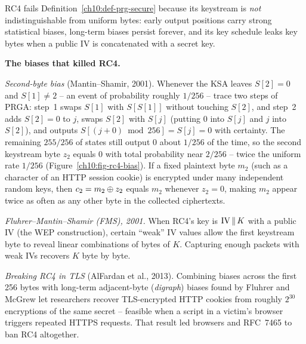 RC4 fails Definition~\ref{ch10:def-prg-secure} because its keystream is \emph{not} indistinguishable from uniform bytes: early output positions carry strong statistical biases, long-term biases persist forever, and its key schedule leaks key bytes when a public IV is concatenated with a secret key.

\begin{attackbox}
\label{ch10:attack-rc4-bias}
\textbf{The biases that killed RC4.}

\emph{Second-byte bias} (Mantin--Shamir, 2001). Whenever the KSA leaves $S[2] = 0$ and $S[1] \ne 2$ -- an event of probability roughly $1/256$ -- trace two steps of PRGA: step~1 swaps $S[1]$ with $S[S[1]]$ without touching $S[2]$, and step~2 adds $S[2] = 0$ to $j$, swaps $S[2]$ with $S[j]$ (putting $0$ into $S[j]$ and $j$ into $S[2]$), and outputs $S[(j + 0) \bmod 256] = S[j] = 0$ with certainty. The remaining $255/256$ of states still output $0$ about $1/256$ of the time, so the second keystream byte $z_2$ equals $0$ with total probability near $2/256$ -- twice the uniform rate $1/256$ (Figure~\ref{ch10:fig-rc4-bias}). If a fixed plaintext byte $m_2$ (such as a character of an HTTP session cookie) is encrypted under many independent random keys, then $c_2 = m_2 \oplus z_2$ equals $m_2$ whenever $z_2 = 0$, making $m_2$ appear twice as often as any other byte in the collected ciphertexts.

\emph{Fluhrer--Mantin--Shamir (FMS), 2001.} When RC4's key is $\text{IV} \,\|\, K$ with a public IV (the WEP construction), certain ``weak'' IV values allow the first keystream byte to reveal linear combinations of bytes of $K$. Capturing enough packets with weak IVs recovers $K$ byte by byte.

\emph{Breaking RC4 in TLS} (AlFardan et al., 2013). Combining biases across the first 256 bytes with long-term adjacent-byte (\emph{digraph}) biases found by Fluhrer and McGrew let researchers recover TLS-encrypted HTTP cookies from roughly $2^{30}$ encryptions of the same secret -- feasible when a script in a victim's browser triggers repeated HTTPS requests. That result led browsers and RFC~7465 to ban RC4 altogether.
\end{attackbox}

